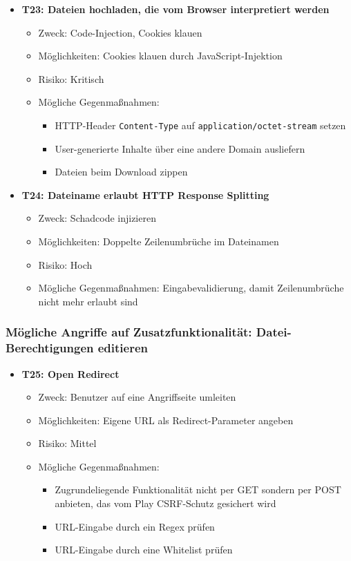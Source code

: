 \documentclass[12pt,DIV14,BCOR10mm,a4paper,parskip=half-,headsepline,headinclude,english,ngerman,bibliography=totocnumbered]{scrreprt}
\begin{document}
\begin{itemize}
  \hypertarget{threat23}{}
  \item \textbf{T23: Dateien hochladen, die vom Browser interpretiert werden}
  \begin{itemize}
  \item Zweck: Code-Injection, Cookies klauen
  \item Möglichkeiten: Cookies klauen durch JavaScript-Injektion
  \item Risiko: Kritisch
  \item Mögliche Gegenmaßnahmen:
    \begin{itemize}
      \item HTTP-Header \texttt{Content-Type} auf \texttt{application/octet-stream} setzen
      \item User-generierte Inhalte über eine andere Domain ausliefern
      \item Dateien beim Download zippen
    \end{itemize}
  \end{itemize}

  \hypertarget{threat24}{}
  \item \textbf{T24: Dateiname erlaubt HTTP Response Splitting}
  \begin{itemize}
  \item Zweck: Schadcode injizieren
  \item Möglichkeiten: Doppelte Zeilenumbrüche im Dateinamen
  \item Risiko: Hoch
  \item Mögliche Gegenmaßnahmen: Eingabevalidierung, damit Zeilenumbrüche nicht mehr erlaubt sind
  \end{itemize}
\end{itemize}

\subsubsection{Mögliche Angriffe auf Zusatzfunktionalität: Datei-Berechtigungen editieren}

\begin{itemize}

  \hypertarget{threat25}{}
  \item \textbf{T25: Open Redirect}
  \begin{itemize}
    \item Zweck: Benutzer auf eine Angriffseite umleiten
    \item Möglichkeiten: Eigene URL als Redirect-Parameter angeben
    \item Risiko: Mittel
    \item Mögliche Gegenmaßnahmen:
      \begin{itemize}
      	\item Zugrundeliegende Funktionalität nicht per GET sondern per POST anbieten, das vom Play CSRF-Schutz gesichert wird
      	\item URL-Eingabe durch ein Regex prüfen
      	\item URL-Eingabe durch eine Whitelist prüfen
      \end{itemize}
  \end{itemize}
\end{itemize}
\end{document}
